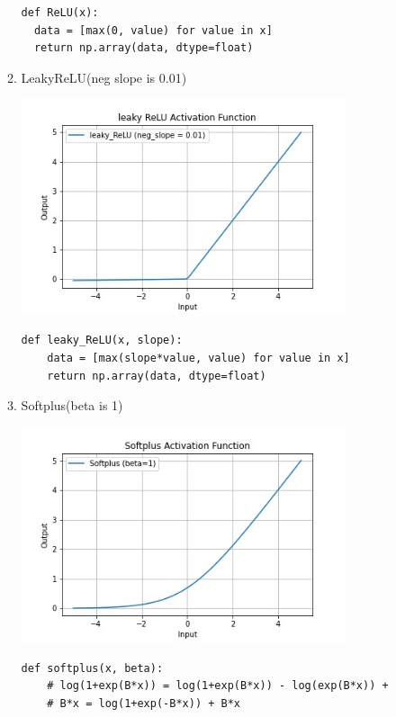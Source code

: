 \documentclass{article}
\begin{document}
\begin{enumerate}
\begin{enumerate}
\begin{tcolorbox}
                \end{tcolorbox}
                \begin{verbatim}
def ReLU(x):
  data = [max(0, value) for value in x]
  return np.array(data, dtype=float)
                \end{verbatim}
          \item LeakyReLU(neg slope is 0.01)
                \begin{tcolorbox}
                  \includegraphics[width=9.5cm]{leaky_relu.jpg}
                \end{tcolorbox}
                \begin{verbatim}
def leaky_ReLU(x, slope):
    data = [max(slope*value, value) for value in x]
    return np.array(data, dtype=float)                  
                \end{verbatim}
          \item Softplus(beta is 1)
                \begin{tcolorbox}
                  \includegraphics[width=9.5cm]{softplus.jpg}
                \end{tcolorbox}
                \begin{verbatim}
def softplus(x, beta):
    # log(1+exp(B*x)) = log(1+exp(B*x)) - log(exp(B*x)) + 
    # B*x = log(1+exp(-B*x)) + B*x

\end{verbatim}
\end{enumerate}
\end{enumerate}
\end{document}

